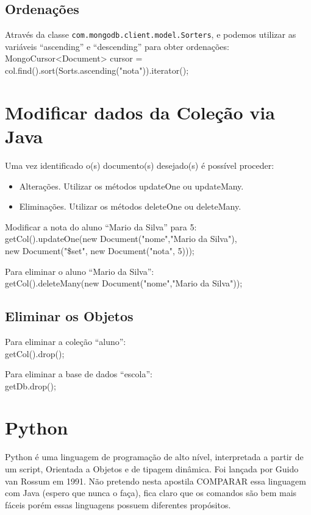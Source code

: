 \documentclass[a4paper,11pt]{article}
\begin{document}
\subsection{Ordenações}
Através da classe \texttt{com.mongodb.client.model.Sorters}, e podemos utilizar as variáveis ``ascending'' e ``descending'' para obter ordenações: \\
{\ttfamily MongoCursor<Document> cursor = \\
	col.find().sort(Sorts.ascending("nota")).iterator();}

\section{Modificar dados da Coleção via Java}
Uma vez identificado o(s) documento(s) desejado(s) é possível proceder:
\begin{itemize}[nolistsep]
  \item Alterações. Utilizar os métodos updateOne ou updateMany.
  \item Eliminações. Utilizar os métodos deleteOne ou deleteMany.
\end{itemize}

Modificar a nota do aluno ``Mario da Silva'' para 5: \\
{\ttfamily getCol().updateOne(new Document("nome","Mario da Silva"), \\
	new Document("\$set", new Document("nota", 5))); }

Para eliminar o aluno ``Mario da Silva'': \\
{\ttfamily getCol().deleteMany(new Document("nome","Mario da Silva"));}

\subsection{Eliminar os Objetos}
Para eliminar a coleção ``aluno'': \\
{\ttfamily getCol().drop(); }

Para eliminar a base de dados ``escola'': \\
{\ttfamily getDb.drop();}

\section{Python}
Python é uma linguagem de programação de alto nível, interpretada a partir de um script, Orientada a Objetos e de tipagem dinâmica. Foi lançada por Guido van Rossum em 1991. Não pretendo nesta apostila COMPARAR essa linguagem com Java (espero que nunca o faça), fica claro que os comandos são bem mais fáceis porém essas linguagens possuem diferentes propósitos.
\end{document}
